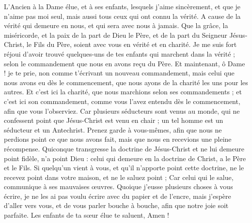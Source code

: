 \BFont
\begin{multicols}{2}
\VerseOne{}L'Ancien à la Dame élue, et à ses enfants, lesquels j'aime sincèrement, et que je n'aime pas moi seul, mais aussi tous ceux qui ont connu la vérité.
A cause de la vérité qui demeure en nous, et qui sera avec nous à jamais.
Que la grâce, la miséricorde, et la paix de la part de Dieu le Père, et de la part du Seigneur Jésus-Christ, le Fils du Père, soient avec vous en vérité et en charité.
Je me suis fort réjoui d'avoir trouvé quelques-uns de tes enfants qui marchent dans la vérité ; selon le commandement que nous en avons reçu du Père.
Et maintenant, ô Dame ! je te prie, non comme t'écrivant un nouveau commandement, mais celui que nous avons eu dès le commencement, que nous ayons de la charité les uns pour les autres.
Et c'est ici la charité, que nous marchions selon ses commandements ; et c'est ici son commandement, comme vous l'avez entendu dès le commencement, afin que vous l'observiez.
Car plusieurs séducteurs sont venus au monde, qui ne confessent point que Jésus-Christ est venu en chair ; un tel homme est un séducteur et un Antechrist.
Prenez garde à vous-mêmes, afin que nous ne perdions point ce que nous avons fait, mais que nous en recevions une pleine récompense.
Quiconque transgresse la doctrine de Jésus-Christ et ne lui demeure point fidèle, n'a point Dieu : celui qui demeure en la doctrine de Christ, a le Père et le Fils.
Si quelqu'un vient à vous, et qu'il n'apporte point cette doctrine, ne le recevez point dans votre maison, et ne le saluez point ;
Car celui qui le salue, communique à ses mauvaises œuvres.
Quoique j'eusse plusieurs choses à vous écrire, je ne les ai pas voulu écrire avec du papier et de l'encre, mais j'espère d'aller vers vous, et de vous parler bouche à bouche, afin que notre joie soit parfaite.
Les enfants de ta sœur élue te saluent, Amen !
\PPE{}
\end{multicols}
